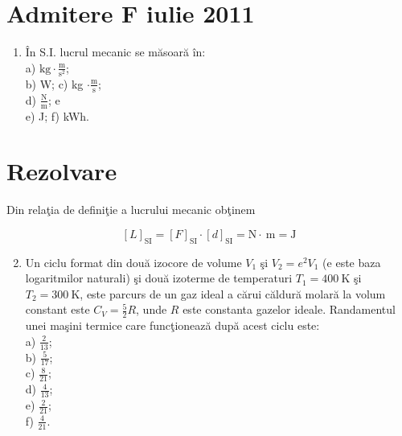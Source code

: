 \section{Admitere F iulie 2011}

\begin{enumerate}
  \item În S.I. lucrul mecanic se măsoară în:\\
a) $\mathrm{kg} \cdot \frac{\mathrm{m}}{\mathrm{s}^{2}}$;\\
b) W; c) kg $\cdot \frac{\mathrm{m}}{\mathrm{s}}$;\\
d) $\frac{\mathrm{N}}{\mathrm{m}}$; e\\
e) J; f) kWh.
\end{enumerate}

\section*{Rezolvare}
Din relaţia de definiţie a lucrului mecanic obţinem

$$
[L]_{\mathrm{SI}}=[F]_{\mathrm{SI}} \cdot[d]_{\mathrm{SI}}=\mathrm{N} \cdot \mathrm{~m}=\mathrm{J}
$$

\begin{enumerate}
  \setcounter{enumi}{1}
  \item Un ciclu format din două izocore de volume $V_{1}$ şi $V_{2}=e^{2} V_{1}$ (e este baza logaritmilor naturali) şi două izoterme de temperaturi $T_{1}=400 \mathrm{~K}$ şi $T_{2}=300 \mathrm{~K}$, este parcurs de un gaz ideal a cărui căldură molară la volum constant este $C_{V}=\frac{5}{2} R$, unde $R$ este constanta gazelor ideale. Randamentul unei maşini termice care funcţionează după acest ciclu este:\\
a) $\frac{2}{13}$;\\
b) $\frac{5}{17}$;\\
c) $\frac{8}{21}$;\\
d) $\frac{4}{13}$;\\
e) $\frac{2}{21}$;\\
f) $\frac{4}{21}$.
\end{enumerate}

